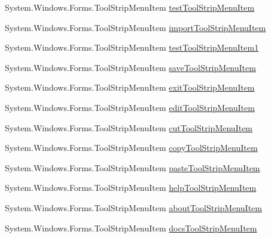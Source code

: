 \begin{DoxyCompactItemize}
System.\+Windows.\+Forms.\+Tool\+Strip\+Menu\+Item \mbox{\hyperlink{class_cert_complete_1_1_cert_complete_a0e264ac32de8dadd9c7c4c61671aec03}{test\+Tool\+Strip\+Menu\+Item}}
\item 
System.\+Windows.\+Forms.\+Tool\+Strip\+Menu\+Item \mbox{\hyperlink{class_cert_complete_1_1_cert_complete_adadd62da8a950273d32a601995be172d}{import\+Tool\+Strip\+Menu\+Item}}
\item 
System.\+Windows.\+Forms.\+Tool\+Strip\+Menu\+Item \mbox{\hyperlink{class_cert_complete_1_1_cert_complete_a231635f4b70814e3b8e13a58c1fcb6f7}{test\+Tool\+Strip\+Menu\+Item1}}
\item 
System.\+Windows.\+Forms.\+Tool\+Strip\+Menu\+Item \mbox{\hyperlink{class_cert_complete_1_1_cert_complete_ac8e71505fc559814f6d0e23f2c67ba91}{save\+Tool\+Strip\+Menu\+Item}}
\item 
System.\+Windows.\+Forms.\+Tool\+Strip\+Menu\+Item \mbox{\hyperlink{class_cert_complete_1_1_cert_complete_abfdc08fb1d4e22c6cd157c1727fd9d75}{exit\+Tool\+Strip\+Menu\+Item}}
\item 
System.\+Windows.\+Forms.\+Tool\+Strip\+Menu\+Item \mbox{\hyperlink{class_cert_complete_1_1_cert_complete_a639e868e61b8d868d7322c17ac8e84a9}{edit\+Tool\+Strip\+Menu\+Item}}
\item 
System.\+Windows.\+Forms.\+Tool\+Strip\+Menu\+Item \mbox{\hyperlink{class_cert_complete_1_1_cert_complete_ad0543650b83ed2dbe6090eaaaa16e44c}{cut\+Tool\+Strip\+Menu\+Item}}
\item 
System.\+Windows.\+Forms.\+Tool\+Strip\+Menu\+Item \mbox{\hyperlink{class_cert_complete_1_1_cert_complete_ae69da7db68f18929d02c8781070fbc24}{copy\+Tool\+Strip\+Menu\+Item}}
\item 
System.\+Windows.\+Forms.\+Tool\+Strip\+Menu\+Item \mbox{\hyperlink{class_cert_complete_1_1_cert_complete_a0beabb140e581a2090a6d4d4c6c447e5}{paste\+Tool\+Strip\+Menu\+Item}}
\item 
System.\+Windows.\+Forms.\+Tool\+Strip\+Menu\+Item \mbox{\hyperlink{class_cert_complete_1_1_cert_complete_a5d1d13a89fd672b44a98961a80c8a219}{help\+Tool\+Strip\+Menu\+Item}}
\item 
System.\+Windows.\+Forms.\+Tool\+Strip\+Menu\+Item \mbox{\hyperlink{class_cert_complete_1_1_cert_complete_a6fc7fa494117f5dd920b1dfbbf4c3799}{about\+Tool\+Strip\+Menu\+Item}}
\item 
System.\+Windows.\+Forms.\+Tool\+Strip\+Menu\+Item \mbox{\hyperlink{class_cert_complete_1_1_cert_complete_a16ac892442f05f6ffa8a0e2268372734}{docs\+Tool\+Strip\+Menu\+Item}}
\item 

\end{DoxyCompactItemize}
